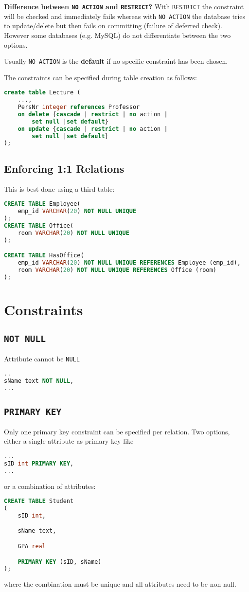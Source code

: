 \documentclass{article}
\renewcommand{\t}[1]{\texttt{#1}}
\begin{document}
\textbf{Difference between \t{NO ACTION} and \t{RESTRICT}?} With \t{RESTRICT} the constraint will be checked and immediately fails whereas with \t{NO ACTION} the database tries to update/delete but then fails on committing (failure of deferred check). However some databases (e.g. MySQL) do not differentiate between the two options.

Usually \t{NO ACTION} is the \textbf{default} if no specific constraint has been chosen.

The constraints can be specified during table creation as follows:

\begin{lstlisting}[language=SQL]
create table Lecture (
	...,
	PersNr integer references Professor
	on delete {cascade | restrict | no action |
		set null |set default}
	on update {cascade | restrict | no action |
		set null |set default}
); 
\end{lstlisting}

\subsection*{Enforcing 1:1 Relations}

This is best done using a third table:
\begin{lstlisting}[language=SQL]
CREATE TABLE Employee(
	emp_id VARCHAR(20) NOT NULL UNIQUE
);
CREATE TABLE Office(
	room VARCHAR(20) NOT NULL UNIQUE
);

CREATE TABLE HasOffice(
	emp_id VARCHAR(20) NOT NULL UNIQUE REFERENCES Employee (emp_id),
	room VARCHAR(20) NOT NULL UNIQUE REFERENCES Office (room)
);
\end{lstlisting}

\section*{Constraints}

\subsection*{\t{NOT NULL}}
Attribute cannot be \t{NULL}
\begin{lstlisting}[language=SQL]
..
sName text NOT NULL,
...

\end{lstlisting}
\subsection*{\t{PRIMARY KEY}}
Only one primary key constraint can be specified per relation.
Two options, either a single attribute as primary key like
\begin{lstlisting}[language=SQL]
...
sID int PRIMARY KEY,
...
\end{lstlisting}
or a combination of attributes:
\begin{lstlisting}[language=SQL]
CREATE TABLE Student
(
	sID int,

	sName text,

	GPA real

	PRIMARY KEY (sID, sName)
);
\end{lstlisting}
where the combination must be unique and all attributes need to be non null.
\end{document}
